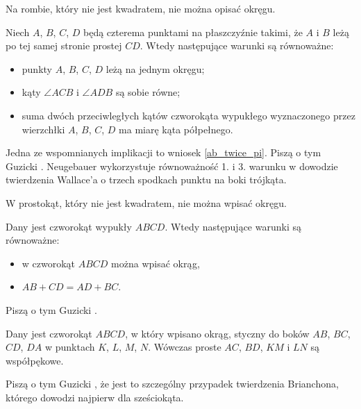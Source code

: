 
Na rombie, który nie jest kwadratem, nie można opisać okręgu.

\begin{proposition}
%
\label{prp_incircle}
	Niech $A$, $B$, $C$, $D$ będą czterema punktami na płaszczyźnie takimi, że $A$ i $B$ leżą po tej samej stronie prostej $CD$.
	Wtedy następujące warunki są równoważne:
	\begin{itemize}
		\item punkty $A$, $B$, $C$, $D$ leżą na jednym okręgu;
		\item kąty $\angle ACB$ i $\angle ADB$ są sobie równe;
		\item suma dwóch przeciwległych kątów czworokąta wypukłego wyznaczonego przez wierzchłki $A$, $B$, $C$, $D$ ma miarę kąta półpełnego.
	\end{itemize}
\end{proposition}

Jedna ze wspomnianych implikacji to wniosek \ref{ab_twice_pi}.
Piszą o tym Guzicki \cite[s. 11-13, 16, 17]{guzicki_2021}.
Neugebauer \cite[s. 25]{neugebauer_2018} wykorzystuje równoważność 1. i 3. warunku w dowodzie twierdzenia Wallace'a o trzech spodkach punktu na boki trójkąta.

W prostokąt, który nie jest kwadratem, nie można wpisać okręgu.

\begin{proposition}
	\label{prp_excircle}
	Dany jest czworokąt wypukły $ABCD$.
	Wtedy następujące warunki są równoważne:
	\begin{itemize}
		\item w czworokąt $ABCD$ można wpisać okrąg,
		\item $AB + CD = AD + BC$.
	\end{itemize}
\end{proposition}

Piszą o tym Guzicki \cite[s. 231-237]{guzicki_2021}.

\begin{proposition}
	Dany jest czworokąt $ABCD$, w który wpisano okrąg, styczny do boków $AB$, $BC$, $CD$, $DA$ w punktach $K$, $L$, $M$, $N$.
	Wówczas proste $AC$, $BD$, $KM$ i $LN$ są współpękowe.
\end{proposition}

Piszą o tym Guzicki \cite[s. 237, 238]{guzicki_2021}, że jest to szczególny przypadek twierdzenia Brianchona, którego dowodzi najpierw dla sześciokąta.

